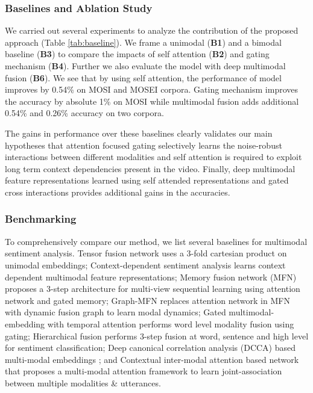 \documentclass{article}
\begin{document}
\subsubsection{Baselines and Ablation Study}
We carried out several experiments to analyze the contribution of the proposed approach (Table \ref{tab:baseline}). We frame a unimodal (\textbf{B1}) and a bimodal baseline (\textbf{B3}) to compare the impacts of self attention (\textbf{B2}) and gating mechanism (\textbf{B4}). Further we also evaluate the model with deep multimodal fusion (\textbf{B6}). We see that by using self attention, the performance of model improves by 0.54\% on MOSI and MOSEI corpora. Gating mechanism improves the accuracy by absolute 1\% on MOSI while multimodal fusion adds additional 0.54\% and 0.26\% accuracy on two corpora. 

The gains in performance over these baselines clearly validates our main hypotheses that attention focused gating selectively learns the noise-robust interactions between different modalities and self attention is required to exploit long term context dependencies present in the video. Finally, deep multimodal feature representations learned using self attended representations and gated cross interactions provides additional gains in the accuracies.

\subsubsection{Benchmarking}
To comprehensively compare our method, we list several baselines for multimodal sentiment analysis. 
Tensor fusion network \cite{DBLP:conf/emnlp/ZadehCPCM17} uses a 3-fold cartesian product on unimodal embeddings;
Context-dependent sentiment analysis \cite{poria2017context} learns context dependent multimodal feature representations;
Memory fusion network (MFN) \cite{zadeh2018memory} proposes a 3-step architecture for multi-view sequential learning using attention network and gated memory; 
Graph-MFN \cite{DBLP:conf/acl/MorencyCPLZ18} replaces attention network in MFN with dynamic fusion graph to learn modal dynamics; 
Gated multimodal-embedding with temporal attention \cite{DBLP:conf/icmi/ChenWLBZM17} performs word level modality fusion using gating; 
Hierarchical fusion \cite{georgiou2019deep} performs 3-step fusion at word, sentence and high level for sentiment classification; 
Deep canonical correlation analysis (DCCA) based multi-modal embeddings \cite{sun2019multi}; and Contextual inter-modal attention based network \cite{DBLP:conf/emnlp/GhosalACPEB18} that proposes a multi-modal attention framework to learn joint-association between multiple modalities \& utterances.
\end{document}

